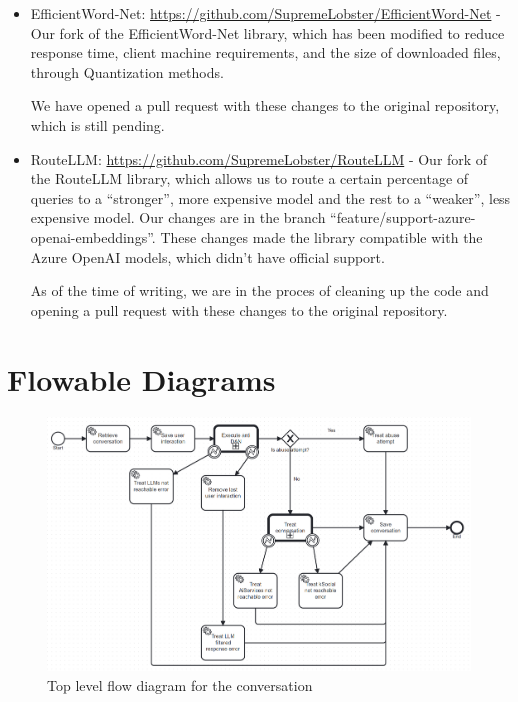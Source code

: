 \documentclass[a4paper,12pt,twoside]{ThesisStyle}
\begin{document}
\begin{itemize}
  \item EfficientWord-Net: \url{https://github.com/SupremeLobster/EfficientWord-Net} - Our fork of the EfficientWord-Net library, which has been modified to reduce response time, client machine requirements, and the size of downloaded files, through Quantization methods.
  
  We have opened a pull request with these changes to the original repository, which is still pending.
  \item RouteLLM: \url{https://github.com/SupremeLobster/RouteLLM} - Our fork of the RouteLLM library, which allows us to route a certain percentage of queries to a ``stronger'', more expensive model and the rest to a ``weaker'', less expensive model. Our changes are in the branch ``feature/support-azure-openai-embeddings''. These changes made the library compatible with the Azure OpenAI models, which didn't have official support.
  
  As of the time of writing, we are in the proces of cleaning up the code and opening a pull request with these changes to the original repository.
\end{itemize}

\backmatter


% 




\appendix


\chapter{Flowable Diagrams}
\label{cap:flowable_diagrams}

\begin{figure}[H]
  \centering
  \includegraphics[width=1\textwidth]{img/Conversation_process.bpmn20.png}
  \caption{Top level flow diagram for the conversation}
  \label{fig:conversation}
\end{figure}
\end{document}

